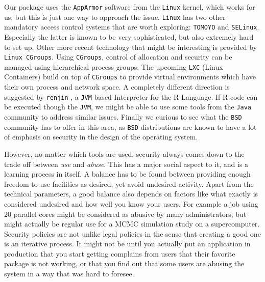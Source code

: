 \documentclass[article]{jss}
\begin{document}
Our package uses the \texttt{AppArmor} software from the \texttt{Linux} kernel,
which works for us, but this is just one way to approach the issue.
\texttt{Linux} has two other mandatory access control systems that are worth
exploring: \texttt{TOMOYO} and \texttt{SELinux}. Especially the latter is known
to be very sophisticated, but also extremely hard to set up. Other more recent
technology that might be interesting is provided by \texttt{Linux CGroups}.
Using \texttt{CGroups}, control of allocation and security can be managed using
hierarchical process groups. The upcoming \texttt{LXC} (Linux Containers) build
on top of \texttt{CGroups} to provide virtual environments which have their own
process and network space. A completely different direction is suggested by
\texttt{renjin} \citep{renjin}, a \texttt{JVM}-based Interpreter for the R
Language. If R code can be executed though the \texttt{JVM}, we might be able to
use some tools from the \texttt{Java} community to address similar issues.
Finally we curious to see what the \texttt{BSD} community has to offer in this
area, as \texttt{BSD} distributions are known to have a lot of emphasis on
security in the design of the operating system.

However, no matter which tools are used, security always comes down to the trade
off between \emph{use} and \emph{abuse}. This has a major social aspect to it,
and is a learning process in itself. A balance has to be found between providing
enough freedom to use facilities as desired, yet avoid undesired activity. Apart
from the technical parameters, a good balance also depends on factors like what
exactly is considered undesired and how well you know your users. For example a
job using 20 parallel cores might be considered as abusive by many
administrators, but might actually be regular use for a MCMC simulation
study on a supercomputer. Security policies are not unlike legal policies in the
sense that creating a good one is an iterative process. It might not be until
you actually put an application in production that you start getting complains
from users that their favorite package is not working, or that you find out
that some users are abusing the system in a way that was hard to foresee.



\newpage
\end{document}
